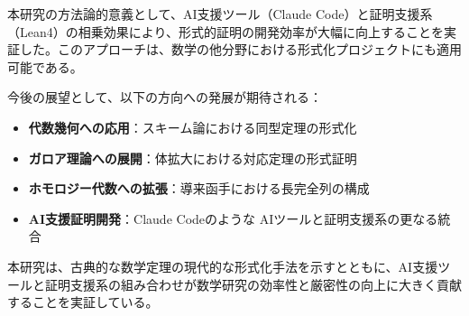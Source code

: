 \documentclass[uplatex, a4paper]{jlreq}
\theoremstyle{definition}
\begin{document}
本研究の方法論的意義として、AI支援ツール（Claude Code）と証明支援系（Lean4）の相乗効果により、形式的証明の開発効率が大幅に向上することを実証した。このアプローチは、数学の他分野における形式化プロジェクトにも適用可能である。

今後の展望として、以下の方向への発展が期待される：
\begin{itemize}
\item \textbf{代数幾何への応用}：スキーム論における同型定理の形式化
\item \textbf{ガロア理論への展開}：体拡大における対応定理の形式証明
\item \textbf{ホモロジー代数への拡張}：導来函手における長完全列の構成
\item \textbf{AI支援証明開発}：Claude Codeのような AIツールと証明支援系の更なる統合
\end{itemize}

本研究は、古典的な数学定理の現代的な形式化手法を示すとともに、AI支援ツールと証明支援系の組み合わせが数学研究の効率性と厳密性の向上に大きく貢献することを実証している。
\end{document}
